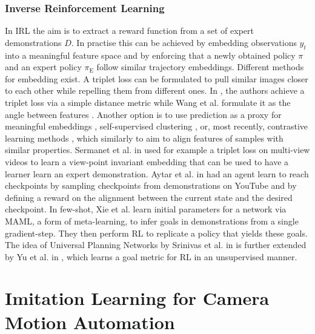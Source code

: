 \subsubsection{Inverse Reinforcement Learning}
In IRL the aim is to extract a reward function from a set of expert demonstrations $D$. In practise this can be achieved by embedding observations $y_t$ into a meaningful feature space and by enforcing that a newly obtained policy $\pi$ and an expert policy $\pi_\text{E}$ follow similar trajectory embeddings. Different methods for embedding exist. A triplet loss can be formulated to pull similar images closer to each other while repelling them from different ones. In \cite{wang2014learning, schroff2015facenet}, the authors achieve a triplet loss via a simple distance metric while Wang et al. formulate it as the angle between features \cite{wang2015unsupervised}. Another option is to use prediction as a proxy for meaningful embeddings \cite{vondrick2016anticipating, sermanet2016unsupervised, srivastava2015unsupervised, mathieu2015deep}, self-supervised clustering \cite{caron2018deep}, or, most recently, contrastive learning methods \cite{khosla2020supervised}, which similarly to \cite{wang2015unsupervised} aim to align features of samples with similar properties. Sermanet et al. in \cite{sermanet2018time} used for example a triplet loss on multi-view videos to learn a view-point invariant embedding that can be used to have a learner learn an expert demonstration. Aytar et al. in \cite{aytar2018playing} had an agent learn to reach checkpoints by sampling checkpoints from demonstrations on YouTube and by defining a reward on the alignment between the current state and the desired checkpoint. In few-shot, Xie et al. \cite{xie2018few} learn initial parameters for a network via MAML, a form of meta-learning, to infer goals in demonstrations from a single gradient-step. They then perform RL to replicate a policy that yields these goals. The idea of Universal Planning Networks by Srinivas et al. in \cite{srinivas2018universal} is further extended by Yu et al. in \cite{yu2019unsupervised}, which learns a goal metric for RL in an unsupervised manner.

\section{Imitation Learning for Camera Motion Automation}
\label{in:sec:imitation_learning}

